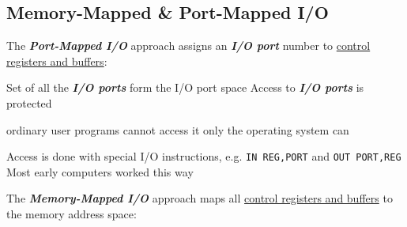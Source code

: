 \subsection*{Memory-Mapped \& Port-Mapped I/O}

The \textbf{\textit{Port-Mapped I/O}} approach assigns an
\textbf{\textit{I/O port}} number to \ul{control registers and buffers}:

\begin{itemize}

    \vItem
          Set of all the \textbf{ \textit{I/O ports}} form the I/O port space
    \vItem
          Access to \textbf{ \textit{I/O ports}} is protected

          \begin{itemize}

              \vItem
                    ordinary user programs cannot access it
              \vItem
                    only the operating system can
          \end{itemize}
    \vItem
          Access is done with special I/O instructions,
          e.g. \texttt{IN\ REG,PORT} and \texttt{OUT\ PORT,REG}
    \vItem
          Most early computers worked this way
\end{itemize}

The \textbf{ \textit{Memory-Mapped I/O}} approach maps all \ul{control registers and buffers} to the
memory address space:

